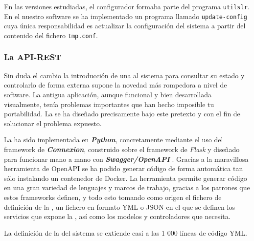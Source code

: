 En las versiones estudiadas, el configurador formaba parte del programa \texttt{utilslr}. En el nuestro software se ha implementado un programa llamado \texttt{update-config} cuya única responsabilidad es actualizar la configuración del sistema a partir del contenido del fichero \texttt{tmp.conf}.

\subsubsection{La API-REST}

Sin duda el cambio la introducción de una  al sistema para consultar su estado y controlarlo de forma externa supone la novedad más rompedora a nivel de software. La antigua aplicación, aunque funcional y bien desarrollada visualmente, tenía problemas importantes que han hecho imposible tu portabilidad. La  se ha diseñado precisamente bajo este pretexto y con el fin de solucionar el problema expuesto.

La  ha sido implementada en \textbf{\textit{Python}}, concretamente mediante el uso del framework de \textbf{\textit{Connexion}}, construido sobre el framework de \textit{Flask} y diseñado para funcionar mano a mano con \textbf{\textit{Swagger/OpenAPI}} \cite{swagger}. Gracias a la maravillosa herramienta de OpenAPI \cite{openapi} se ha podido generar código de forma automática tan sólo instalando un contenedor de Docker. La herramienta permite generar código en una gran variedad de lenguajes y marcos de trabajo, gracias a los patrones que estos frameworks definen, y todo esto tomando como origen el fichero de definición de la , un fichero en formato YML o \acrshort{JSON} en el que se definen los servicios que expone la , así como los modelos y controladores que necesita.

La definición de la  del sistema se extiende casi a las 1 000 líneas de código YML. \\

